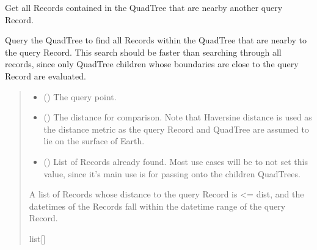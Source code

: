 \documentclass[letterpaper,10pt,english]{sphinxmanual}
\begin{document}
\begin{fulllineitems}
\begin{fulllineitems}
\label{\detokenize{quadtree:GeoSpatialTools.quadtree.QuadTree.nearby_points}}
\pysigstartsignatures
\pysiglinewithargsret
{}
{\sphinxparamcomma {}\sphinxparamcomma {}}
{}
\pysigstopsignatures
\sphinxAtStartPar
Get all Records contained in the QuadTree that are nearby
another query Record.

\sphinxAtStartPar
Query the QuadTree to find all Records within the QuadTree that
are nearby to the query Record. This search should be faster
than searching through all records, since only QuadTree children whose
boundaries are close to the query Record are evaluated.
\begin{quote}\begin{description}
\begin{itemize}
\item {} 
\sphinxAtStartPar
{} ({\hyperref[\detokenize{record:GeoSpatialTools.record.Record}]{}}) \textendash{} The query point.

\item {} 
\sphinxAtStartPar
{} () \textendash{} The distance for comparison. Note that Haversine distance is used
as the distance metric as the query Record and QuadTree are
assumed to lie on the surface of Earth.

\item {} 
\sphinxAtStartPar
{} (\sphinxstyleliteralemphasis{\sphinxupquote{ | }}) \textendash{} List of Records already found. Most use cases will be to
not set this value, since it’s main use is for passing onto the
children QuadTrees.

\end{itemize}

\sphinxAtStartPar
A list of Records whose distance to the
query Record is \textless{}= dist, and the datetimes of the
Records fall within the datetime range of the query
Record.

\sphinxAtStartPar
list{[}{\hyperref[\detokenize{record:GeoSpatialTools.record.Record}]{}}{]}


\end{description}
\end{quote}
\end{fulllineitems}
\end{fulllineitems}
\end{document}
